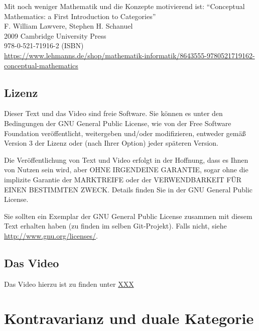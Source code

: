 \documentclass[a4paper]{amsart}
\theoremstyle{definition}
\begin{document}
Mit noch weniger Mathematik und die Konzepte motivierend ist:
"`Conceptual Mathematics: a First Introduction to Categories"'\\
F. William Lawvere, Stephen H. Schanuel\\
2009 Cambridge University Press\\
978-0-521-71916-2 (ISBN)\\
{\tiny\url{https://www.lehmanns.de/shop/mathematik-informatik/8643555-9780521719162-conceptual-mathematics}}

\subsection*{Lizenz}
Dieser Text und das Video sind freie Software. Sie können es unter den Bedingungen der
GNU General Public License, wie von der Free Software Foundation veröffentlicht, weitergeben
und/oder modifizieren, entweder gemäß Version 3 der Lizenz oder (nach Ihrer Option) jeder späteren Version.

Die Veröffentlichung von Text und Video erfolgt in der Hoffnung, dass es Ihnen von Nutzen sein wird,
aber OHNE IRGENDEINE GARANTIE, sogar ohne die implizite Garantie der MARKTREIFE oder der
VERWENDBARKEIT FÜR EINEN BESTIMMTEN ZWECK. Details finden Sie in der GNU General Public License.

Sie sollten ein Exemplar der GNU General Public License zusammen mit diesem Text erhalten haben
(zu finden im selben Git-Projekt).
Falls nicht, siehe \url{http://www.gnu.org/licenses/}.

\subsection*{Das Video}
Das Video hierzu ist zu finden unter
{\tiny
   \url{XXX}
}

\section{Kontravarianz und duale Kategorie}
\end{document}
